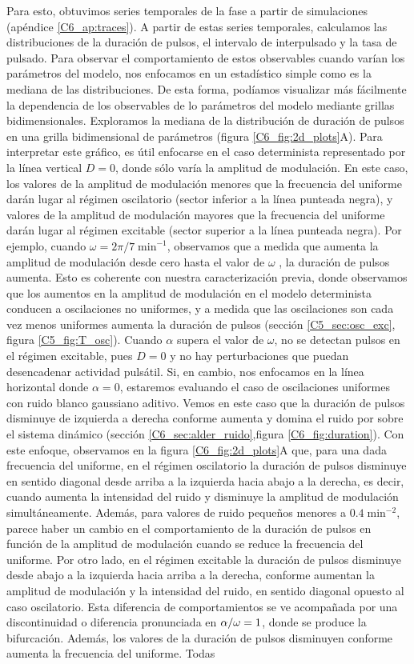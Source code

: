 \documentclass[./main.tex]{subfiles}
\begin{document}
Para esto, obtuvimos series temporales de la fase a partir de simulaciones (apéndice \ref{C6_ap:traces}). A partir de estas series temporales, calculamos las distribuciones de la duración de pulsos, el intervalo de interpulsado y la tasa de pulsado. Para observar el comportamiento de estos observables cuando varían los parámetros del modelo, nos enfocamos en un estadístico simple como es la mediana de las distribuciones. De esta forma, podíamos visualizar más fácilmente la dependencia de los observables de lo parámetros del modelo mediante grillas bidimensionales. Exploramos la mediana de la distribución de duración de pulsos en una grilla bidimensional de parámetros (figura \ref{C6_fig:2d_plots}A). Para interpretar este gráfico, es útil enfocarse en el caso determinista representado por la línea vertical $D=0$, donde sólo varía la amplitud de modulación. En este caso, los valores de la amplitud de modulación menores que la frecuencia del uniforme darán lugar al régimen oscilatorio (sector inferior a la línea punteada negra), y valores de la amplitud de modulación mayores que la frecuencia del uniforme darán lugar al régimen excitable (sector superior a la línea punteada negra). Por ejemplo, cuando $\omega = 2\pi/7\; \text{min}^{-1}$, observamos que a medida que aumenta la amplitud de modulación desde cero hasta el valor de $\omega$ , la duración de pulsos aumenta. Esto es coherente con nuestra caracterización previa, donde observamos que los aumentos en la amplitud de modulación en el modelo determinista conducen a oscilaciones no uniformes, y a medida que las oscilaciones son cada vez menos uniformes aumenta la duración de pulsos (sección \ref{C5_sec:osc_exc}, figura \ref{C5_fig:T_osc}). Cuando $\alpha$ supera el valor de $\omega$, no se detectan pulsos en el régimen excitable, pues $D=0$ y no hay perturbaciones que puedan desencadenar actividad pulsátil. Si, en cambio, nos enfocamos en la línea horizontal donde $\alpha=0$, estaremos evaluando el caso de oscilaciones uniformes con ruido blanco gaussiano aditivo. Vemos en este caso que la duración de pulsos disminuye de izquierda a derecha conforme aumenta y domina el ruido por sobre el sistema dinámico (sección \ref{C6_sec:alder_ruido},figura \ref{C6_fig:duration}). Con este enfoque, observamos en la figura \ref{C6_fig:2d_plots}A que, para una dada frecuencia del uniforme, en el régimen oscilatorio la duración de pulsos disminuye en sentido diagonal desde arriba a la izquierda hacia abajo a la derecha, es decir, cuando aumenta la intensidad del ruido y disminuye la amplitud de modulación simultáneamente. Además, para valores de ruido pequeños menores a $0.4 \;\text{min}^{-2}$, parece haber un cambio en el comportamiento de la duración de pulsos en función de la amplitud de modulación cuando se reduce la frecuencia del uniforme. Por otro lado, en el régimen excitable la duración de pulsos disminuye desde abajo a la izquierda hacia arriba a la derecha, conforme aumentan la amplitud de modulación y la intensidad del ruido, en sentido diagonal opuesto al caso oscilatorio. Esta diferencia de comportamientos se ve acompañada por una discontinuidad o diferencia pronunciada en $\alpha/\omega = 1$, donde se produce la bifurcación. Además, los valores de la duración de pulsos disminuyen conforme aumenta la frecuencia del uniforme. Todas 
\end{document}
